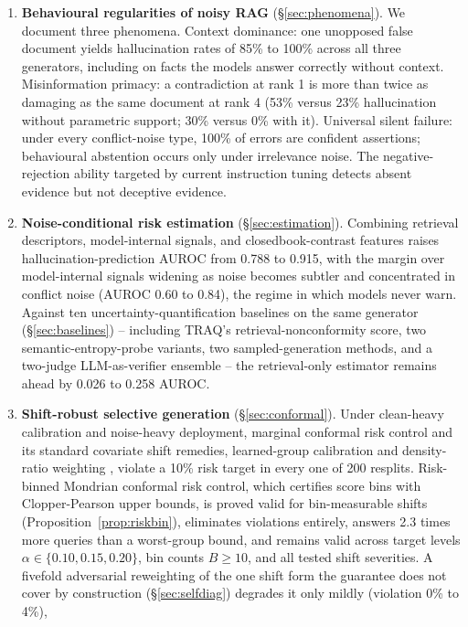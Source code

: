 \documentclass[sn-basic]{sn-jnl}
\theoremstyle{thmstyleone}
\theoremstyle{thmstyletwo}
\begin{document}
\begin{enumerate}
\item \textbf{Behavioural regularities of noisy RAG}
(\S\ref{sec:phenomena}). We document three phenomena. Context
dominance: one unopposed false document yields hallucination rates of
85\% to 100\% across all three generators, including on facts the
models answer correctly without context. Misinformation primacy: a
contradiction at rank 1 is more than twice as damaging as the same
document at rank 4 (53\% versus 23\% hallucination without parametric
support; 30\% versus 0\% with it). Universal silent failure: under
every conflict-noise type, 100\% of errors are confident assertions;
behavioural abstention occurs only under irrelevance noise. The
negative-rejection ability targeted by current instruction tuning
\citep{chen2023rgb} detects absent evidence but not
deceptive evidence.
\item \textbf{Noise-conditional risk estimation}
(\S\ref{sec:estimation}). Combining retrieval descriptors, model-internal signals, and
closedbook-contrast features raises hallucination-prediction AUROC from 0.788
to 0.915, with the margin over model-internal signals widening as noise becomes
subtler and concentrated in conflict noise (AUROC 0.60 to 0.84), the regime in
which models never warn. Against ten uncertainty-quantification baselines on
the same generator (\S\ref{sec:baselines}) -- including TRAQ's
retrieval-nonconformity score, two semantic-entropy-probe variants, two
sampled-generation methods, and a two-judge LLM-as-verifier ensemble -- the
retrieval-only estimator remains ahead by 0.026 to 0.258 AUROC.
\item \textbf{Shift-robust selective generation}
(\S\ref{sec:conformal}). Under clean-heavy calibration and noise-heavy
deployment, marginal conformal risk control and its standard covariate
shift remedies, learned-group calibration and density-ratio weighting
\citep{tibshirani2019covariate}, violate a 10\% risk target in every
one of 200 resplits. Risk-binned Mondrian conformal risk control,
which certifies score bins with Clopper-Pearson upper bounds, is proved
valid for bin-measurable shifts (Proposition~\ref{prop:riskbin}),
eliminates violations entirely, answers 2.3 times more queries than a
worst-group bound, and remains valid across target levels
$\alpha \in \{0.10, 0.15, 0.20\}$, bin counts $B \ge 10$, and all
tested shift severities. A fivefold adversarial reweighting of the one
shift form the guarantee does not cover by construction
(\S\ref{sec:selfdiag}) degrades it only mildly (violation 0\% to 4\%),

\end{enumerate}
\end{document}
